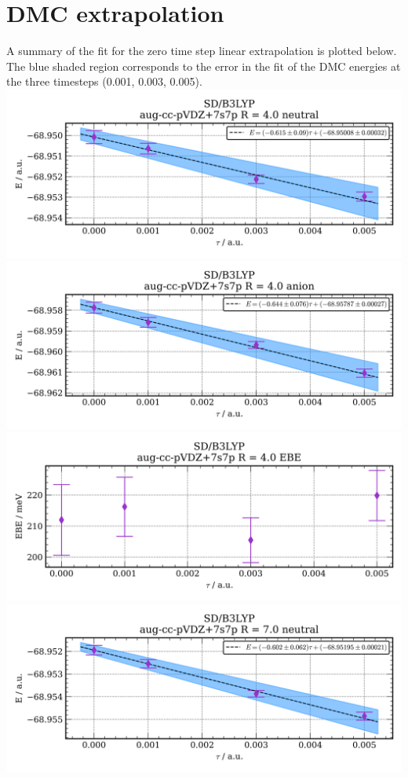 \section{DMC extrapolation}
A summary of the fit for the zero time step linear extrapolation is plotted below. The blue shaded region corresponds to the error in the fit of the DMC energies at the three timesteps (0.001, 0.003, 0.005).
\includegraphics[width=\textwidth,keepaspectratio]{images/SDshivB3LYP__aug-cc-pvdz+7s7p__4p0_01_neutral.png}
\includegraphics[width=\textwidth,keepaspectratio]{images/SDshivB3LYP__aug-cc-pvdz+7s7p__4p0_02_anion.png}
\includegraphics[width=\textwidth,keepaspectratio]{images/SDshivB3LYP__aug-cc-pvdz+7s7p__4p0_03_ebe.png}
\includegraphics[width=\textwidth,keepaspectratio]{images/SDshivB3LYP__aug-cc-pvdz+7s7p__7p0_01_neutral.png}
